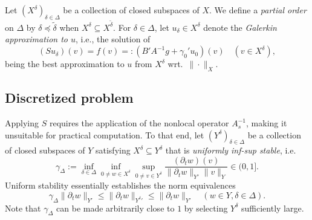 \documentclass[11pt,a4paper,oneside,english]{amsart}
\numberwithin{equation}{section}
\numberwithin{theorem}{section}
\theoremstyle{definition}
\begin{document}
Let $(X^\delta)_{\delta \in \Delta}$ be a collection of closed subspaces of $X$.
We define a \emph{partial order} on $\Delta$ by $\delta \preceq \tilde{\delta}$
when $X^\delta \subseteq X^{\tilde{\delta}}$. For $\delta \in \Delta$, let
$u_\delta \in X^\delta$ denote the {\em Galerkin approximation to $u$}, i.e., the solution of
\begin{equation}
  (Su_\delta)(v)=f(v) =: (B' A^{-1} g + \gamma_0' u_0)(v) \quad (v \in X^\delta),
  \label{eqn:galerkin}
\end{equation}
being the best approximation to $u$ from $X^\delta$ wrt.~$\|\cdot\|_X$.

\subsection{Discretized problem}
Applying $S$ requires the application of the nonlocal operator $A_s^{-1}$, making it
unsuitable for practical computation. To that end, let $(Y^\delta)_{\delta \in \Delta}$
be a collection of closed subspaces of $Y$ satisfying $X^\delta \subseteq Y^\delta$
that is \emph{uniformly inf-sup stable}, i.e.
\begin{equation}
  \gamma_\Delta:=\inf_{\delta \in \Delta}\inf_{0 \neq w \in X^\delta}\sup_{0\neq v \in Y^\delta} \frac{(\partial_t w)(v)}{\|\partial_t w\|_{Y'}\|v\|_Y} \in (0,1].
  \label{eqn:infinfsup}
\end{equation}
Uniform stability essentially establishes the norm equivalences
\[
  \gamma_\Delta \|\partial_t w\|_{Y'} \leq \|\partial_t w\|_{{Y^\delta}'} \leq \|\partial_t w\|_{Y'} \quad (w \in Y, \delta \in \Delta).
\]
Note that $\gamma_\Delta$ can be made arbitrarily close to $1$ by selecting $Y^\delta$ sufficiently large.
\end{document}
